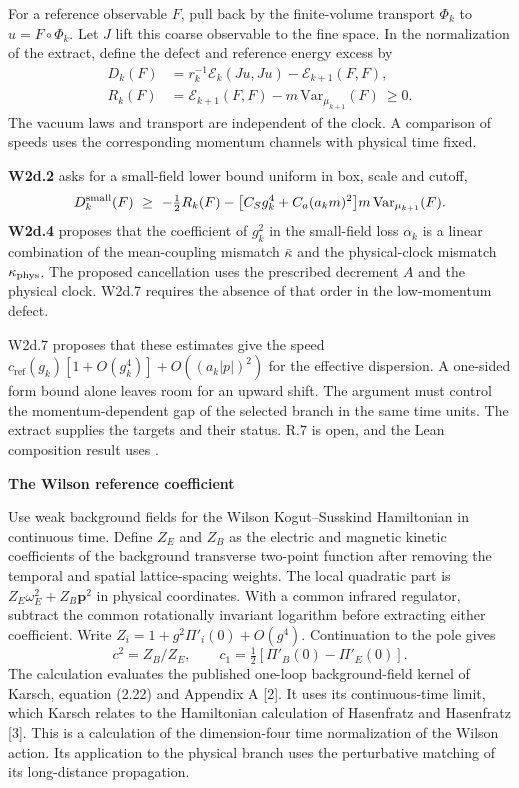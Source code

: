 \documentclass[11pt,a4paper]{article}
\newcommand{\Title}[1]{\par{\raggedright\sffamily\bfseries\color{ink}\fontsize{22}{26}\selectfont #1\par}\vspace{3pt}}
\newcommand{\Section}[1]{\par\addvspace{6pt}{\sffamily\bfseries\color{teal}\large #1\par}\nobreak\vspace{1pt}}
\newcommand{\code}[1]{\texttt{\detokenize{#1}}}
\newcommand{\cR}{c_{\mathrm{ref}}}
\begin{document}
\Section{The W2d inputs}
For a reference observable $F$, pull back by the finite-volume transport $\Phi_k$ to $u=F\circ\Phi_k$. Let $J$ lift this coarse observable to the fine space. In the normalization of the extract, define the defect and reference energy excess by
\begin{align*}
 D_k(F)&=r_k^{-1}\mathcal E_k(Ju,Ju)-\mathcal E_{k+1}(F,F),\\
 R_k(F)&=\mathcal E_{k+1}(F,F)-m\,\mathrm{Var}_{\mu_{k+1}}(F)\ \ge 0.
\end{align*}
The vacuum laws and transport are independent of the clock. A comparison of speeds uses the corresponding momentum channels with physical time fixed.

\textbf{W2d.2} asks for a small-field lower bound uniform in box, scale and cutoff,
\[
 D_k^{\rm small}(F)\ \ge\ -\tfrac12 R_k(F)
 -\bigl[C_S g_k^4+C_a(a_km)^2\bigr]m\,\mathrm{Var}_{\mu_{k+1}}(F).
\]
\textbf{W2d.4} proposes that the coefficient of $g_k^2$ in the small-field loss $\alpha_k$ is a linear combination of the mean-coupling mismatch $\bar\kappa$ and the physical-clock mismatch $\kappa_{\rm phys}$. The proposed cancellation uses the prescribed decrement $A$ and the physical clock. W2d.7 requires the absence of that order in the low-momentum defect.

W2d.7 proposes that these estimates give the speed $\cR(g_k)[1+O(g_k^4)]+O((a_k|p|)^2)$ for the effective dispersion. A one-sided form bound alone leaves room for an upward shift. The argument must control the momentum-dependent gap of the selected branch in the same time units. The extract supplies the targets and their status. R.7 is open, and the Lean composition result uses \code{DispersionHyp}.

\clearpage
\Title{The Wilson reference coefficient}
Use weak background fields for the Wilson Kogut--Susskind Hamiltonian in continuous time. Define $Z_E$ and $Z_B$ as the electric and magnetic kinetic coefficients of the background transverse two-point function after removing the temporal and spatial lattice-spacing weights. The local quadratic part is $Z_E\omega_E^2+Z_B\mathbf p^2$ in physical coordinates. With a common infrared regulator, subtract the common rotationally invariant logarithm before extracting either coefficient. Write $Z_i=1+g^2\Pi'_i(0)+O(g^4)$. Continuation to the pole gives
\[
 c^2=Z_B/Z_E,\qquad c_1=\tfrac12[\Pi'_B(0)-\Pi'_E(0)] .
\]
The calculation evaluates the published one-loop background-field kernel of Karsch, equation (2.22) and Appendix A [2]. It uses its continuous-time limit, which Karsch relates to the Hamiltonian calculation of Hasenfratz and Hasenfratz [3]. This is a calculation of the dimension-four time normalization of the Wilson action. Its application to the physical branch uses the perturbative matching of its long-distance propagation.
\end{document}
